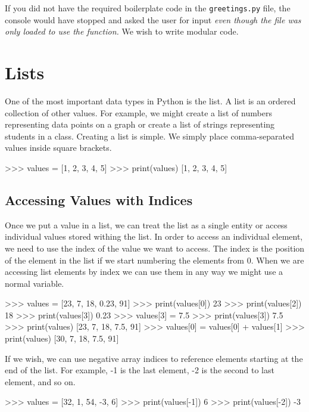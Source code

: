\documentclass[11pt]{cselabheader}
\begin{document}
If you did not have the required boilerplate code in the \texttt{greetings.py}
file, the console would have stopped and asked the user for input
\emph{even though the file was only loaded to use the
 function.}
We wish to write modular code.


\pagebreak
\section{Lists}
One of the most important data types in Python is the list. A list is an ordered
collection of other values. For example, we might create a list of numbers
representing data points on a graph or create a list of strings representing
students in a class. Creating a list is simple. We simply place comma-separated
values inside square brackets.

\begin{pyconcode}
>>> values = [1, 2, 3, 4, 5]
>>> print(values)
[1, 2, 3, 4, 5]
\end{pyconcode}

\subsection{Accessing Values with Indices}
Once we put a value in a list, we can treat the list as a single entity or
access individual values stored withing the list. In order to access an
individual element, we need to use the index of the value we want to access.
The index is the position of the element in the list if we start numbering the
elements from 0. When we are accessing list elements by index we can use them
in any way we might use a normal variable.

\begin{pyconcode}
>>> values = [23, 7, 18, 0.23, 91]
>>> print(values[0])
23
>>> print(values[2])
18
>>> print(values[3])
0.23
>>> values[3] = 7.5
>>> print(values[3])
7.5
>>> print(values)
[23, 7, 18, 7.5, 91]
>>> values[0] = values[0] + values[1]
>>> print(values)
[30, 7, 18, 7.5, 91]
\end{pyconcode}

If we wish, we can use negative array indices to reference elements starting at
the end of the list. For example, -1 is the last element, -2 is the second to
last element, and so on.

\begin{pyconcode}
>>> values = [32, 1, 54, -3, 6]
>>> print(values[-1])
6
>>> print(values[-2])
-3
\end{pyconcode}
\end{document}
